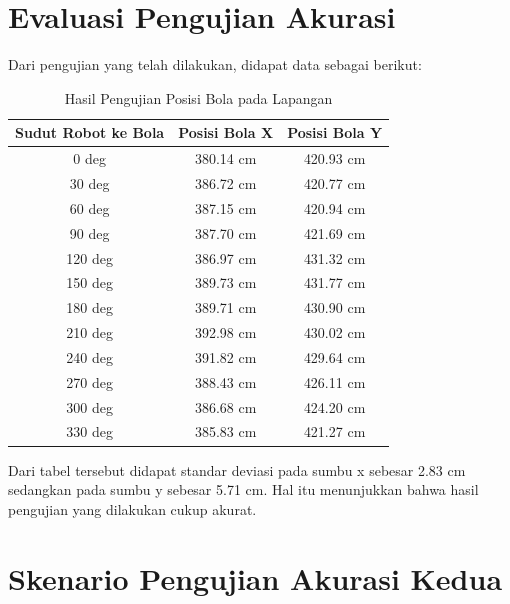 \section{Evaluasi Pengujian Akurasi}
\label{sec:analisispengujian}

Dari pengujian yang telah dilakukan, didapat data sebagai berikut:

\begin{longtable}{|c|c|c|}
  \caption{Hasil Pengujian Posisi Bola pada Lapangan}
  \label{tb:posisibolalapangan}                                   \\
  \hline
  \rowcolor[HTML]{C0C0C0}
  \textbf{Sudut Robot ke Bola} & \textbf{Posisi Bola X} & \textbf{Posisi Bola Y} \\
  \hline
  0 deg            & 380.14 cm                & 420.93 cm            \\
  30 deg           & 386.72 cm                & 420.77 cm            \\
  60 deg           & 387.15 cm                & 420.94 cm            \\
  90 deg           & 387.70 cm                & 421.69 cm           \\
  120 deg           & 386.97 cm                & 431.32 cm           \\
  150 deg           & 389.73 cm                & 431.77 cm           \\
  180 deg           & 389.71 cm                & 430.90 cm           \\
  210 deg           & 392.98 cm                & 430.02 cm           \\
  240 deg           & 391.82 cm                & 429.64 cm           \\
  270 deg           & 388.43 cm                & 426.11 cm           \\
  300 deg           & 386.68 cm                & 424.20 cm           \\
  330 deg           & 385.83 cm                & 421.27 cm           \\
  \hline
\end{longtable}

Dari tabel tersebut didapat standar deviasi pada sumbu x sebesar 2.83 cm sedangkan pada sumbu y sebesar 5.71 cm. Hal itu menunjukkan bahwa hasil pengujian yang dilakukan cukup akurat. 

\section{Skenario Pengujian Akurasi Kedua}
\label{sec:skenariopengujian}

